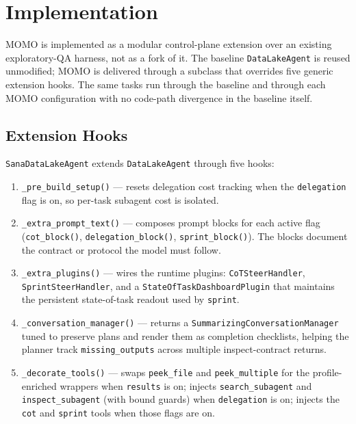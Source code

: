 \section{Implementation}
\label{sec:implementation}

MOMO is implemented as a modular control-plane extension over an existing exploratory-QA harness, not as a fork of it. The baseline \texttt{DataLakeAgent} is reused unmodified; MOMO is delivered through a subclass that overrides five generic extension hooks. The same tasks run through the baseline and through each MOMO configuration with no code-path divergence in the baseline itself.

\subsection{Extension Hooks}

\texttt{SanaDataLakeAgent} extends \texttt{DataLakeAgent} through five hooks:

\begin{enumerate}
\item \texttt{\_pre\_build\_setup()} --- resets delegation cost tracking when the \texttt{delegation} flag is on, so per-task subagent cost is isolated.
\item \texttt{\_extra\_prompt\_text()} --- composes prompt blocks for each active flag (\texttt{cot\_block()}, \texttt{delegation\_block()}, \texttt{sprint\_block()}). The blocks document the contract or protocol the model must follow.
\item \texttt{\_extra\_plugins()} --- wires the runtime plugins: \texttt{CoTSteerHandler}, \texttt{SprintSteerHandler}, and a \texttt{StateOfTaskDashboardPlugin} that maintains the persistent state-of-task readout used by \texttt{sprint}.
\item \texttt{\_conversation\_manager()} --- returns a \texttt{SummarizingConversationManager} tuned to preserve plans and render them as completion checklists, helping the planner track \texttt{missing\_outputs} across multiple inspect-contract returns.
\item \texttt{\_decorate\_tools()} --- swaps \texttt{peek\_file} and \texttt{peek\_multiple} for the profile-enriched wrappers when \texttt{results} is on; injects \texttt{search\_subagent} and \texttt{inspect\_subagent} (with bound guards) when \texttt{delegation} is on; injects the \texttt{cot} and \texttt{sprint} tools when those flags are on.
\end{enumerate}

